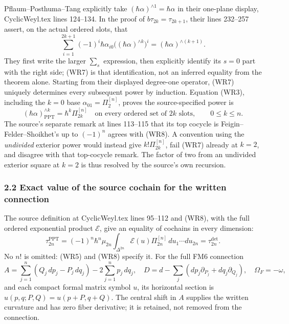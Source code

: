 \documentclass[
  11pt,
]{article}
\begin{document}
Pflaum--Posthuma--Tang explicitly take
\((\hbar\alpha)^{\wedge1}=\hbar\alpha\) in their one-plane display,
CyclicWeyl.tex lines 124--134. In the proof of
\(b\tau_{2k}=\tau_{2k+1}\), their lines 232--257 assert, on the actual
ordered slots, that \[
 \sum_{i=1}^{2k+1}(-1)^i\hbar\alpha_{i0}
       \big((\hbar\alpha)^{\wedge k}\big)^i
   =(\hbar\alpha)^{\wedge(k+1)} .
 \tag{WR7}
\] They first write the larger \(\sum_s\) expression, then explicitly
identify its \(s=0\) part with the right side; (WR7) is that
identification, not an inferred equality from the theorem alone.
Starting from their displayed degree-one operator, (WR7) uniquely
determines every subsequent power by induction. Equation (WR3),
including the \(k=0\) base \(\alpha_{01}=\Pi_2^{[n]}\), proves the
source-specified power is \[
 \boxed{\quad
  (\hbar\alpha)_{\mathrm{PPT}}^{\wedge k}
       =\hbar^k\Pi_{2k}^{[n]}
       \quad\text{on every ordered set of \(2k\) slots},
       \qquad 0\leq k\leq n .
  \quad}
 \tag{WR8}
\] The source's separate remark at lines 113--115 that its top cocycle
is Feigin--Felder--Shoikhet's up to \((-1)^n\) agrees with (WR8). A
convention using the \emph{undivided} exterior power would instead give
\(k!\Pi_{2k}^{[n]}\), fail (WR7) already at \(k=2\), and disagree with
that top-cocycle remark. The factor of two from an undivided exterior
square at \(k=2\) is thus resolved by the source's own recursion.

\subsubsection{2.2 Exact value of the source cochain for the written
connection}\label{exact-value-of-the-source-cochain-for-the-written-connection}

The source definition at CyclicWeyl.tex lines 95--112 and (WR8), with
the full ordered exponential product \(\mathcal E\), give an equality of
cochains in every dimension: \[
 \tau_{2n}^{\mathrm{PPT}}
   =(-1)^n\hbar^n\mu_{2n}
       \int_{\Delta^{2n}}\mathcal E(u)\Pi_{2n}^{[n]}\,du_1\cdots du_{2n}
   =\tau_{2n}^{\det}.
 \tag{WR9}
\] No \(n!\) is omitted: (WR5) and (WR8) specify it. For the full FM6
connection \[
 A=\sum_{j=1}^n(Q_j\,dp_j-P_j\,dq_j)-2\sum_{j=1}^np_j\,dq_j,
 \quad D=d-\sum_j(dp_j\partial_{P_j}+dq_j\partial_{Q_j}),
 \quad \Omega_F=-\omega,
 \tag{WR10}
\] and each compact formal matrix symbol \(u\), its horizontal section
is \(\widehat u(p,q;P,Q)=u(p+P,q+Q)\). The central shift in \(A\)
supplies the written curvature and has zero fiber derivative; it is
retained, not removed from the connection.
\end{document}
